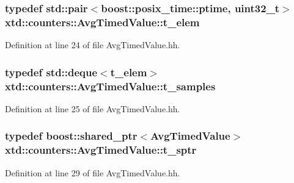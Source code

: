 \subsubsection[{\texorpdfstring{t\+\_\+elem}{t_elem}}]{\setlength{\rightskip}{0pt plus 5cm}typedef std\+::pair$<$boost\+::posix\+\_\+time\+::ptime, uint32\+\_\+t$>$ {\bf xtd\+::counters\+::\+Avg\+Timed\+Value\+::t\+\_\+elem}\hspace{0.3cm}{\ttfamily [protected]}}\hypertarget{classxtd_1_1counters_1_1AvgTimedValue_a1495aff37899fa6b011aed1b4283db18}{}\label{classxtd_1_1counters_1_1AvgTimedValue_a1495aff37899fa6b011aed1b4283db18}


Definition at line 24 of file Avg\+Timed\+Value.\+hh.

\subsubsection[{\texorpdfstring{t\+\_\+samples}{t_samples}}]{\setlength{\rightskip}{0pt plus 5cm}typedef std\+::deque$<${\bf t\+\_\+elem}$>$ {\bf xtd\+::counters\+::\+Avg\+Timed\+Value\+::t\+\_\+samples}\hspace{0.3cm}{\ttfamily [protected]}}\hypertarget{classxtd_1_1counters_1_1AvgTimedValue_a71d5e67cb282762c880dc4986e5a8d7c}{}\label{classxtd_1_1counters_1_1AvgTimedValue_a71d5e67cb282762c880dc4986e5a8d7c}


Definition at line 25 of file Avg\+Timed\+Value.\+hh.

\subsubsection[{\texorpdfstring{t\+\_\+sptr}{t_sptr}}]{\setlength{\rightskip}{0pt plus 5cm}typedef boost\+::shared\+\_\+ptr$<${\bf Avg\+Timed\+Value}$>$ {\bf xtd\+::counters\+::\+Avg\+Timed\+Value\+::t\+\_\+sptr}}\hypertarget{classxtd_1_1counters_1_1AvgTimedValue_a68434add28044efc37c616ec7002d0f8}{}\label{classxtd_1_1counters_1_1AvgTimedValue_a68434add28044efc37c616ec7002d0f8}


Definition at line 29 of file Avg\+Timed\+Value.\+hh.

